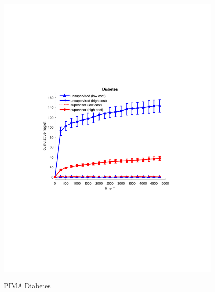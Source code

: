 \begin{figure}[!bt]
\begin{minipage}{4cm}
		\includegraphics[scale=0.3]{../Simulations/Figures/Diabetes_WD1}
		\label{fig:Diabetes}
		\vspace{-.5cm}
		\caption{PIMA Diabetes}
	\end{minipage}
	\begin{minipage}{4cm}
		\centering

\end{minipage}
\end{figure}
